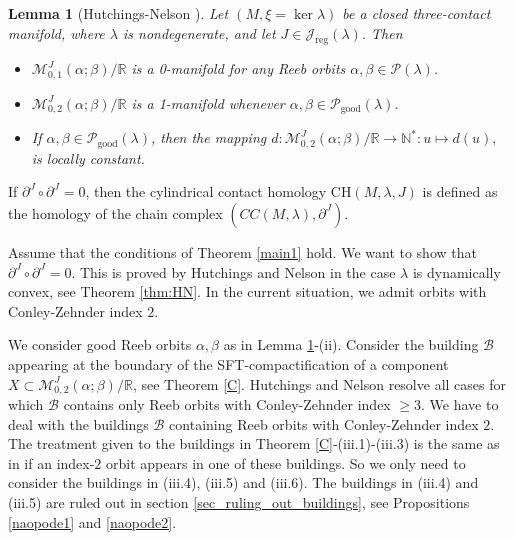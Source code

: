 \documentclass{amsart}
\newcommand{\R}{\mathbb{R}}
\newcommand{\N}{\mathbb{N}}
\newcommand{\M}{\mathcal{M}}
\newtheorem{lemma}[theorem]{Lemma}
\begin{document}
\begin{lemma}[Hutchings-Nelson {\cite[Lemma 4.2]{HN}}] \label{lemma4.2}
Let $(M,\xi = \ker \lambda)$ be a closed three-contact manifold, where $\lambda$ is nondegenerate, and let $J \in \mathcal{J}_{\text{reg}}(\lambda)$. Then
\begin{itemize}
\item[(i)] $\M_{0,1}^{J}(\alpha;\beta)/\R$ is a 0-manifold for any Reeb orbits $\alpha,\beta \in \mathcal {P}(\lambda)$.

\item[(ii)] $\M_{0,2}^{J}(\alpha;\beta)/\R$ is a 1-manifold whenever $\alpha,\beta \in \mathcal{P} _{\text{good}}(\lambda)$.

\item[(iii)] If $\alpha,\beta \in \mathcal{P}_{\text{good}}(\lambda)$, then the mapping
$
d:\M_{0,2}^{J}(\alpha;\beta)/\R \to  \N^*:
u \mapsto  d(u),
$
is locally constant.
\end{itemize}
\end{lemma}
If $\partial^J \circ \partial^J=0$, then the cylindrical contact homology $\text{CH}(M,\lambda,J)$ is defined as the homology of the chain complex $(CC(M,\lambda), \partial^J)$. 

Assume that the conditions of Theorem \ref{main1} hold. We want to show that $\partial^J \circ \partial^J=0$. This is proved by Hutchings and Nelson \cite{HN} in the case $\lambda$ is dynamically convex, see Theorem \ref{thm:HN}. In the current situation, we admit orbits with Conley-Zehnder index $2$. 

We consider good Reeb orbits $\alpha,\beta$ as in Lemma \ref{lemma4.2}-(ii). Consider the building $\mathcal{B}$ appearing at the boundary of the SFT-compactification of a component $X\subset \mathcal M^J_{0,2}(\alpha ; \beta)/ \R$, see Theorem \ref{C}. Hutchings and Nelson resolve all cases for which $\mathcal B$ contains only Reeb orbits with Conley-Zehnder index $\geq 3$. We have to deal with the buildings $\mathcal B$ containing Reeb orbits with Conley-Zehnder index $2$. The treatment given to the buildings in Theorem \ref{C}-(iii.1)-(iii.3) is the same as in \cite{HN} if an index-$2$ orbit appears in one of these buildings. So we only need to consider the buildings in (iii.4), (iii.5) and (iii.6). The buildings in (iii.4) and (iii.5) are ruled out in section \ref{sec_ruling_out_buildings}, see Propositions \ref{naopode1} and \ref{naopode2}.  
\end{document}
